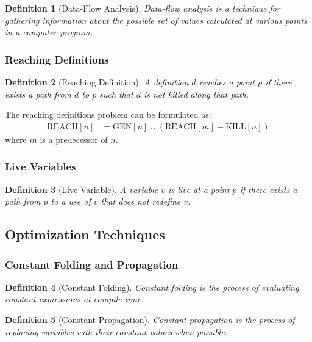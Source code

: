 \documentclass[11pt]{article}
\newtheorem{definition}{Definition}[section]
\begin{document}
\begin{definition}[Data-Flow Analysis]
Data-flow analysis is a technique for gathering information about the possible set of values calculated at various points in a computer program.
\end{definition}

\subsubsection{Reaching Definitions}

\begin{definition}[Reaching Definition]
A definition $d$ reaches a point $p$ if there exists a path from $d$ to $p$ such that $d$ is not killed along that path.
\end{definition}

The reaching definitions problem can be formulated as:
\begin{align}
\text{REACH}[n] &= \text{GEN}[n] \cup (\text{REACH}[m] - \text{KILL}[n])
\end{align}
where $m$ is a predecessor of $n$.

\subsubsection{Live Variables}

\begin{definition}[Live Variable]
A variable $v$ is live at a point $p$ if there exists a path from $p$ to a use of $v$ that does not redefine $v$.
\end{definition}

\subsection{Optimization Techniques}

\subsubsection{Constant Folding and Propagation}

\begin{definition}[Constant Folding]
Constant folding is the process of evaluating constant expressions at compile time.
\end{definition}

\begin{definition}[Constant Propagation]
Constant propagation is the process of replacing variables with their constant values when possible.
\end{definition}
\end{document}
